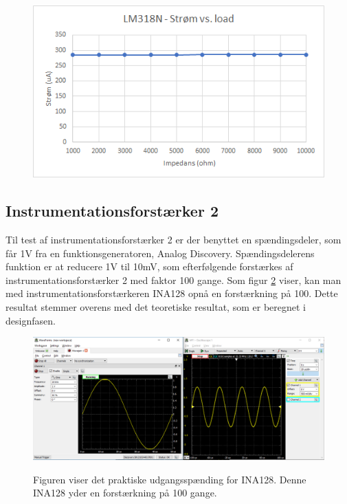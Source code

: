 \begin{figure}[H] 
\centering
{\includegraphics[width=12cm]
{Figure/Stromgeneratorload}}
\caption{}
\label{fig:Stromgeneratorload}
\end{figure}

\subsection{Instrumentationsforstærker 2}

Til test af instrumentationsforstærker 2 er der benyttet en spændingsdeler, som får 1V fra en funktionsgeneratoren, Analog Discovery. Spændingsdelerens funktion er at reducere 1V til 10mV, som efterfølgende forstærkes af instrumentationsforstærker 2 med faktor 100 gange. Som figur \ref{TestAfINA1282} viser, kan man med instrumentationsforstærkeren INA128 opnå en forstærkning på 100. Dette resultat stemmer overens med det teoretiske resultat, som er beregnet i designfasen.  

\begin{figure}[H] 
\centering
{\includegraphics[width=12cm]
{Figure/TestAfINA1282.PNG}}
\caption{Figuren viser det praktiske udgangsspænding for INA128. Denne INA128 yder en forstærkning på 100 gange.}
\label{TestAfINA1282}
\end{figure}






